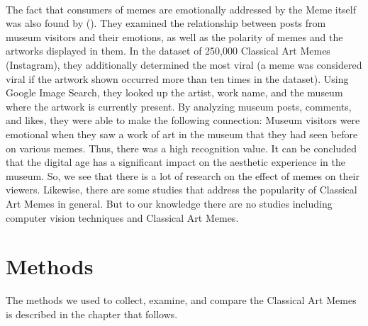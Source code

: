 \documentclass[11pt,a4paper]{article}
\begin{document}
\\The fact that consumers of memes are emotionally addressed by the Meme itself was also found by \citeauthor{Vlachou2022} (\citeyear{Vlachou2022}). They examined the relationship between posts from museum visitors and their emotions, as well as the
polarity of memes and the artworks displayed in them. In the dataset of 250,000 Classical Art Memes (Instagram), they additionally determined the most viral (a meme was considered viral if the artwork shown occurred more than ten times in the dataset). Using Google Image Search, they looked up the artist, work name, and the museum where the artwork is currently present. By analyzing museum posts, comments, and likes, they were able to make the following connection: Museum visitors were emotional when they saw a work of art in the museum that they had seen before on various memes. Thus, there was a high recognition value. It can be concluded that the digital age has a significant impact on the aesthetic experience in the museum.
So, we see that there is a lot of research on the effect of memes on their viewers. Likewise, there are some studies that address the popularity of Classical Art Memes in general. But to our knowledge there are no studies including computer vision techniques and Classical Art Memes. 

 \section{Methods}
 The methods we used to collect, examine, and compare the Classical Art Memes is described in the chapter that follows.
\end{document}
